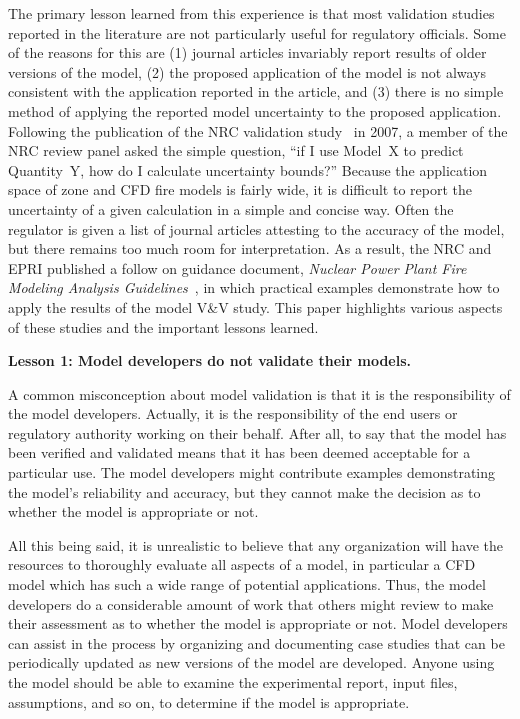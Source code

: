 \documentclass[fleqn,b5paper]{article}
\begin{document}
The primary lesson learned from this experience is that most validation studies reported in the literature are not particularly useful for regulatory officials. Some of the reasons for this are (1) journal articles invariably report results of older versions of the model, (2) the proposed application of the model is not always consistent with the application reported in the article, and (3) there is no simple method of applying the reported model uncertainty to the proposed application. Following the publication of the NRC validation study~\cite{NUREG_1824} in 2007, a member of the NRC review panel asked the simple question, ``if I use Model~X to predict Quantity~Y, how do I calculate uncertainty bounds?'' Because the application space of zone and CFD fire models is fairly wide, it is difficult to report the uncertainty of a given calculation in a simple and concise way. Often the regulator is given a list of journal articles attesting to the accuracy of the model, but there remains too much room for interpretation. As a result, the NRC and EPRI published a follow on guidance document, {\em Nuclear Power Plant Fire Modeling Analysis Guidelines}~\cite{NUREG_1934}, in which practical examples demonstrate how to apply the results of the model V\&V study. This paper highlights various aspects of these studies and the important lessons learned.


\vspace{\parskip}
{\bf Lesson 1: Model developers do not validate their models.}

A common misconception about model validation is that it is the responsibility of the model developers. Actually, it is the responsibility of the end users or regulatory authority working on their behalf. After all, to say that the model has been verified and validated means that it has been deemed acceptable for a particular use. The model developers might contribute examples demonstrating the model's reliability and accuracy, but they cannot make the decision as to whether the model is appropriate or not.

All this being said, it is unrealistic to believe that any organization will have the resources to thoroughly evaluate all aspects of a model, in particular a CFD model which has such a wide range of potential applications. Thus, the model developers do a considerable amount of work that others might review to make their assessment as to whether the model is appropriate or not. Model developers can assist in the process by organizing and documenting case studies that can be periodically updated as new versions of the model are developed. Anyone using the model should be able to examine the experimental report, input files, assumptions, and so on, to determine if the model is appropriate. 
\end{document}
